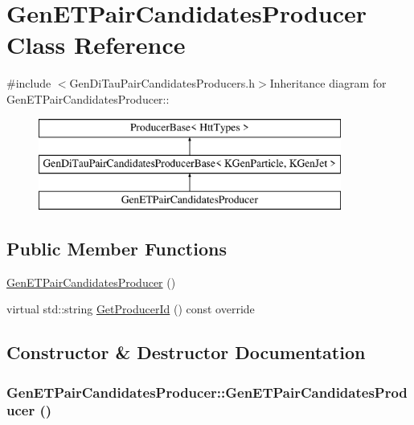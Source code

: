 \hypertarget{classGenETPairCandidatesProducer}{
\section{GenETPairCandidatesProducer Class Reference}
\label{classGenETPairCandidatesProducer}
}


{\ttfamily \#include $<$GenDiTauPairCandidatesProducers.h$>$}Inheritance diagram for GenETPairCandidatesProducer::\begin{figure}[H]
\begin{center}
\leavevmode
\includegraphics[height=3cm]{classGenETPairCandidatesProducer}
\end{center}
\end{figure}
\subsection*{Public Member Functions}
\begin{DoxyCompactItemize}
\item 
\hyperlink{classGenETPairCandidatesProducer_ab015a040ecd2f99712219927de767375}{GenETPairCandidatesProducer} ()
\item 
virtual std::string \hyperlink{classGenETPairCandidatesProducer_a6c2e608601f25fcdf504e8353c870db4}{GetProducerId} () const override
\end{DoxyCompactItemize}


\subsection{Constructor \& Destructor Documentation}
\hypertarget{classGenETPairCandidatesProducer_ab015a040ecd2f99712219927de767375}{
\subsubsection[{GenETPairCandidatesProducer}]{\setlength{\rightskip}{0pt plus 5cm}GenETPairCandidatesProducer::GenETPairCandidatesProducer ()}}
\label{classGenETPairCandidatesProducer_ab015a040ecd2f99712219927de767375}


